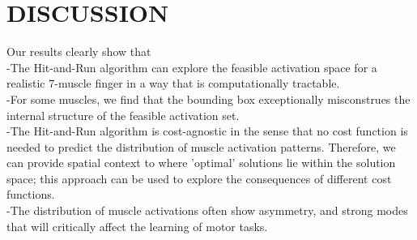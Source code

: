 \section{DISCUSSION}

Our results clearly show that\\
-The Hit-and-Run algorithm can explore the feasible activation space for a realistic 7-muscle finger in a way that is computationally tractable.\\
-For some muscles, we find that the bounding box exceptionally misconstrues the internal structure of the feasible activation set.\\
-The Hit-and-Run algorithm is cost-agnostic in the sense that no cost function is needed to predict the distribution of muscle activation patterns. Therefore, we can provide spatial context to where 'optimal' solutions lie within the solution space; this approach can be used to explore the consequences of different cost functions.\\
-The distribution of muscle activations often show asymmetry, and strong modes that will critically affect the learning of motor tasks.


